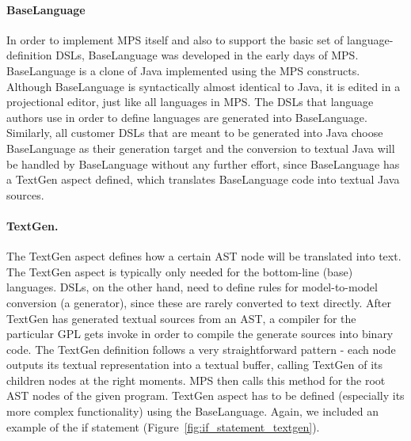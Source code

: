 
\paragraph{BaseLanguage}
In order to implement MPS itself and also to support the basic set of language-definition DSLs, BaseLanguage was developed in the early days of MPS. BaseLanguage is a clone of Java implemented using the MPS constructs. Although BaseLanguage is syntactically almost identical to Java, it is edited in a projectional editor, just like all languages in MPS. The DSLs that language authors use in order to define languages are generated into BaseLanguage. Similarly, all customer DSLs that are meant to be generated into Java choose BaseLanguage as their generation target and the conversion to textual Java will be handled by BaseLanguage without any further effort, since BaseLanguage has a TextGen aspect defined, which translates BaseLanguage code into textual Java sources.

\paragraph{TextGen.}
 The TextGen aspect defines how a certain AST node will be translated into text. The TextGen aspect is typically only needed for the bottom-line (base) languages. DSLs, on the other hand, need to define rules for model-to-model conversion (a generator), since these are rarely converted to text directly. After TextGen has generated textual sources from an AST, a compiler for the particular GPL gets invoke in order to compile the generate sources into binary code.
The TextGen definition follows a very straightforward pattern - each node outputs its textual representation into a textual buffer, calling TextGen of its children nodes at the right moments. MPS then calls this method for the root AST nodes of the given program.
TextGen aspect has to be defined (especially its more complex functionality) using the BaseLanguage.
Again, we included an example of the if statement (Figure~\ref{fig:if_statement_textgen}).

